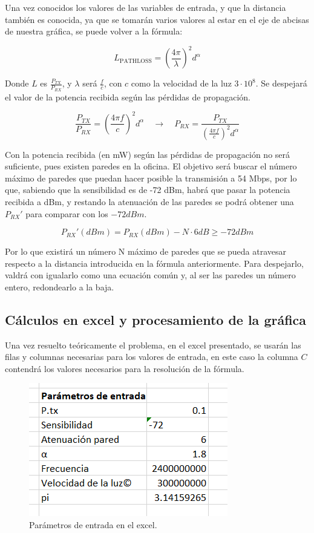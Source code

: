 \documentclass{article}
\begin{document}
Una vez conocidos los valores de las variables de entrada, y que la distancia también es conocida, ya que se tomarán varios valores al estar en el eje de abcisas de nuestra gráfica, se puede volver a la fórmula:

$$L_{\text{PATHLOSS}} = \left(\frac{4\pi}{\lambda}\right)^{2}d^\alpha$$

Donde $L$ es $\frac{P_{TX}}{P_{RX}}$, y $\lambda$ será $\frac{f}{c}$, con $c$ como la velocidad de la luz $3 \cdot 10^8$. Se despejará el valor de la potencia recibida según las pérdidas de propagación.

$$\frac{P_{TX}}{P_{RX}} = \left(\frac{4\pi f}{c}\right)^2 d^\alpha \quad \rightarrow \quad P_{RX}  = \frac{P_{TX}}{\left(\frac{4\pi f}{c}\right)^2 d^\alpha }$$

Con la potencia recibida (en mW) según las pérdidas de propagación no será suficiente, pues existen paredes en la oficina. El objetivo será buscar el número máximo de paredes que puedan hacer posible la transmisión a 54 Mbps, por lo que, sabiendo que la sensibilidad es de -72 dBm, habrá que pasar la potencia recibida a dBm, y restando la atenuación de las paredes se podrá obtener una $P_{RX}'$ para comparar con los $-72dBm$. 

$$P_{RX}' (dBm) = P_{RX}(dBm) - N \cdot 6 dB \geq -72dBm$$ 

\quad

Por lo que existirá un número N máximo de paredes que se pueda atravesar respecto a la distancia introducida en la fórmula anteriormente. Para despejarlo, valdrá con igualarlo como una ecuación común y, al ser las paredes un número entero, redondearlo a la baja.

\subsection{Cálculos en excel y procesamiento de la gráfica}

Una vez resuelto teóricamente el problema, en el excel presentado, se usarán las filas y columnas necesarias para los valores de entrada, en este caso la columna $C$ contendrá los valores necesarios para la resolución de la fórmula.

\begin{figure}[h]
      \centering
      \includegraphics[width=0.35\linewidth]{EXCEL3O6fvT3iZ7.png}
      \caption{\label{fig:excele} Parámetros de entrada en el excel.}
\end{figure}
\end{document}
